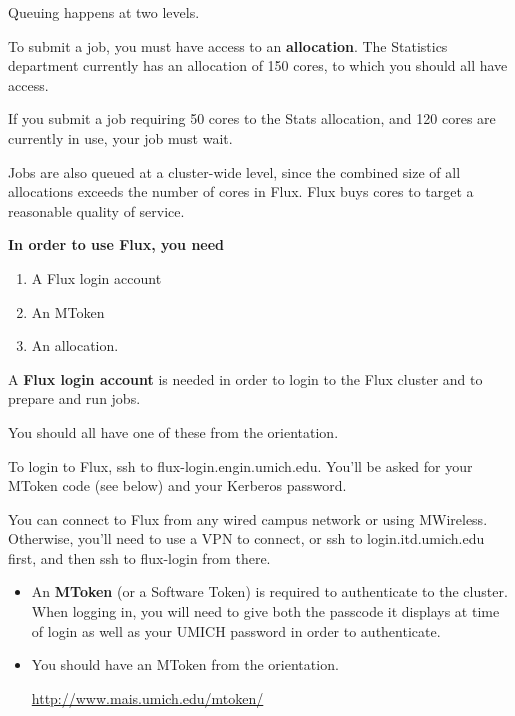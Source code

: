 \documentclass[portrait,11pt]{seminar}
\begin{document}
\es
\bs

Queuing happens at two levels.

\begin{myitemize}
\item
To submit a job, you must have access to an {\bf allocation}. The Statistics department currently has an allocation of 150 cores, to which you should all have access.
\item If you submit a job requiring 50 cores to the Stats allocation, and 
120 cores are currently in use, your job must wait.
\item Jobs are also queued at a cluster-wide level, since the combined size of all allocations exceeds the number of cores in Flux. 
Flux buys cores to target a reasonable quality of service. 
\end{myitemize}

\es


\bs 

{\bf In order to use Flux, you need }
\begin{enumerate}
\item A Flux login account
\item An MToken
\item An allocation.
\end{enumerate}

\es

\bs
\begin{myitemize}
\item
A {\bf Flux login account} is needed in order to login to the Flux cluster and to prepare and run jobs.

\item 
You should all have one of these from the orientation.

\item
To login to Flux, ssh to flux-login.engin.umich.edu.  You'll be asked for your MToken code (see below) and your Kerberos password.  

\item
You can connect to Flux from any wired campus network or using MWireless.  Otherwise, you'll need to use a VPN to connect, or ssh to login.itd.umich.edu first, and then ssh to flux-login from there.
\end{myitemize}

\es


\bs

\begin{itemize}
\item
An {\bf MToken} (or a Software Token) is required to authenticate to the cluster. When logging in, you will need to give both the passcode it displays at time of login as well as your UMICH password in order to authenticate. 

\item You should have an MToken from the orientation.

\url{http://www.mais.umich.edu/mtoken/}
\end{itemize}
\es
\bs
\end{document}
